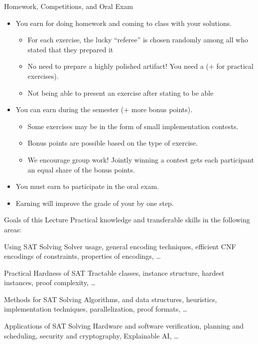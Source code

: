 \documentclass[t]{sdqbeamer}
\begin{document}
\begin{frame}{Homework, Competitions, and Oral Exam}
\begin{itemize}\setlength{\itemsep}{1em}
	\item You earn  for doing homework and coming to class with your solutions.
	\begin{itemize}
		\item For each exercise, the lucky ``referee'' is chosen randomly among all who stated that they prepared it
		\item No need to prepare a highly polished artifact! You need a  (+  for practical exercises).
		\item Not being able to present an exercise after stating to be able 
	\end{itemize}
	\item You can earn  during the semester (+ more bonus points).
	\begin{itemize}
		\item Some exercises may be in the form of small implementation contests.
		\item Bonus points are possible based on the type of exercise.
		\item We encourage group work! Jointly winning a contest gets each participant an equal share of the bonus points.
	\end{itemize}
	\item You must earn  to participate in the oral exam.
	\item Earning  will improve the grade of your  by one step.
\end{itemize}
\end{frame}

\begin{frame}{Goals of this Lecture}
Practical knowledge and transferable skills in the following areas:
\vspace*{5mm}
\begin{block}{Using SAT Solving}
	Solver usage, general encoding techniques, efficient CNF encodings of constraints, properties of encodings, \dots
\end{block}
\pause
\begin{block}{Practical Hardness of SAT}
Tractable classes, instance structure, hardest instances, proof complexity, \dots
\end{block}
\pause
\begin{block}{Methods for SAT Solving}
	Algorithms, and data structures, heuristics, implementation techniques, parallelization, proof formats, \dots
\end{block}
\pause
\begin{block}{Applications of SAT Solving}
	Hardware and software verification, planning and scheduling, security and cryptography, Explainable AI, \dots
\end{block}
\end{frame}
\end{document}
